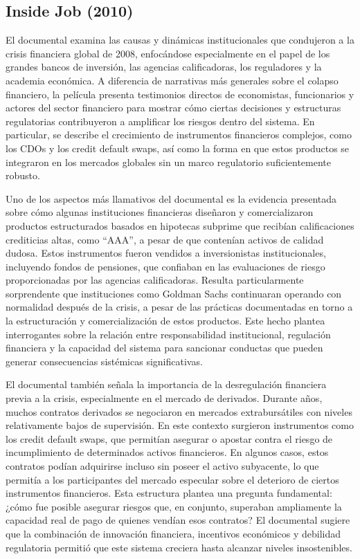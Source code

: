 \subsection{Inside Job (2010)}

El documental examina las causas y dinámicas institucionales que condujeron a la crisis financiera global de 2008, enfocándose especialmente en el papel de los grandes bancos de inversión, las agencias calificadoras, los reguladores y la academia económica. A diferencia de narrativas más generales sobre el colapso financiero, la película presenta testimonios directos de economistas, funcionarios y actores del sector financiero para mostrar cómo ciertas decisiones y estructuras regulatorias contribuyeron a amplificar los riesgos dentro del sistema. En particular, se describe el crecimiento de instrumentos financieros complejos, como los CDOs y los credit default swaps, así como la forma en que estos productos se integraron en los mercados globales sin un marco regulatorio suficientemente robusto.

Uno de los aspectos más llamativos del documental es la evidencia presentada sobre cómo algunas instituciones financieras diseñaron y comercializaron productos estructurados basados en hipotecas subprime que recibían calificaciones crediticias altas, como “AAA”, a pesar de que contenían activos de calidad dudosa. Estos instrumentos fueron vendidos a inversionistas institucionales, incluyendo fondos de pensiones, que confiaban en las evaluaciones de riesgo proporcionadas por las agencias calificadoras. Resulta particularmente sorprendente que instituciones como Goldman Sachs continuaran operando con normalidad después de la crisis, a pesar de las prácticas documentadas en torno a la estructuración y comercialización de estos productos. Este hecho plantea interrogantes sobre la relación entre responsabilidad institucional, regulación financiera y la capacidad del sistema para sancionar conductas que pueden generar consecuencias sistémicas significativas.

El documental también señala la importancia de la desregulación financiera previa a la crisis, especialmente en el mercado de derivados. Durante años, muchos contratos derivados se negociaron en mercados extrabursátiles con niveles relativamente bajos de supervisión. En este contexto surgieron instrumentos como los credit default swaps, que permitían asegurar o apostar contra el riesgo de incumplimiento de determinados activos financieros. En algunos casos, estos contratos podían adquirirse incluso sin poseer el activo subyacente, lo que permitía a los participantes del mercado especular sobre el deterioro de ciertos instrumentos financieros. Esta estructura plantea una pregunta fundamental: ¿cómo fue posible asegurar riesgos que, en conjunto, superaban ampliamente la capacidad real de pago de quienes vendían esos contratos? El documental sugiere que la combinación de innovación financiera, incentivos económicos y debilidad regulatoria permitió que este sistema creciera hasta alcanzar niveles insostenibles.

